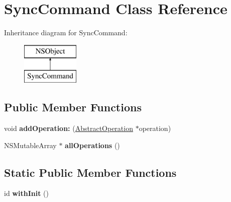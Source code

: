 \hypertarget{interface_sync_command}{
\section{\-Sync\-Command \-Class \-Reference}
\label{interface_sync_command}
}
\-Inheritance diagram for \-Sync\-Command\-:\begin{figure}[H]
\begin{center}
\leavevmode
\includegraphics[height=2.000000cm]{interface_sync_command}
\end{center}
\end{figure}
\subsection*{\-Public \-Member \-Functions}
\begin{DoxyCompactItemize}
\item 
\hypertarget{interface_sync_command_a69884d51064251d12a74b5e5b833f1ef}{
void {\bfseries add\-Operation\-:} (\hyperlink{interface_abstract_operation}{\-Abstract\-Operation} $\ast$operation)}
\label{interface_sync_command_a69884d51064251d12a74b5e5b833f1ef}

\item 
\hypertarget{interface_sync_command_a8fe0f53bab49a741b3d31c2583310476}{
\-N\-S\-Mutable\-Array $\ast$ {\bfseries all\-Operations} ()}
\label{interface_sync_command_a8fe0f53bab49a741b3d31c2583310476}

\end{DoxyCompactItemize}
\subsection*{\-Static \-Public \-Member \-Functions}
\begin{DoxyCompactItemize}
\item 
\hypertarget{interface_sync_command_a0060988a4e786b06d328679e00bc6807}{
id {\bfseries with\-Init} ()}
\label{interface_sync_command_a0060988a4e786b06d328679e00bc6807}

\end{DoxyCompactItemize}
